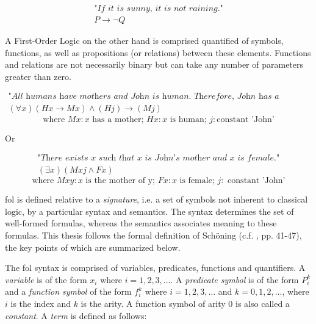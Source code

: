\begin{equation*}
    \begin{gathered}
        \textit{"If it is sunny, it is not raining."}\\
        P \rightarrow \lnot Q
    \end{gathered}
\end{equation*}

A First-Order Logic on the other hand is comprised quantified of symbols, functions, as well as propositions (or relations) between these elements.
Functions and relations are not necessarily binary but can take any number of parameters greater than zero.

\begin{equation*}
    \begin{gathered}
        \textit{"All humans have mothers and John is human. Therefore, John has a mother."}\\
        (\forall x)(Hx \rightarrow Mx) \wedge (Hj) \rightarrow (Mj)
    \end{gathered}
\end{equation*}
\begin{equation*}
    \text{where }
    Mx: x \text{ has a mother; }
    Hx: x \text{ is human; }
    j: \text{constant 'John'}
\end{equation*}

Or

\begin{equation*}
    \begin{gathered}
        \textit{"There exists x such that x is John's mother and x is female."}\\
        (\exists x)(Mxj \wedge Fx)
    \end{gathered}
\end{equation*}
\begin{equation*}
    \text{where }
    Mxy: x \text{ is the mother of y; }
    Fx: x \text{ is female; }
    j: \text{ constant 'John'}
\end{equation*}

\gls{fol} is defined relative to a \textit{signature}, i.e. a set of symbols not inherent to classical logic, by a particular syntax and semantics.
The syntax determines the set of well-formed formulas, whereas the semantics associates meaning to these formulas.
This thesis follows the formal definition of Schöning (c.f. \cite{schoning2008logic}, pp. 41-47), the key points of which are summarized below.

The \gls{fol} syntax is comprised of variables, predicates, functions and quantifiers.
A \textit{variable} is of the form $x_i$ where $i= 1, 2, 3, \ldots$.
A \textit{predicate symbol} is of the form $P_i^k$ and a \textit{function symbol} of the form $f_i^k$ where $i = 1, 2, 3 , \ldots$ and
$k = 0, 1, 2, \ldots$, where $i$ is the index and $k$ is the arity.
A function symbol of arity 0 is also called a \textit{constant}.
A \textit{term} is defined as follows:

